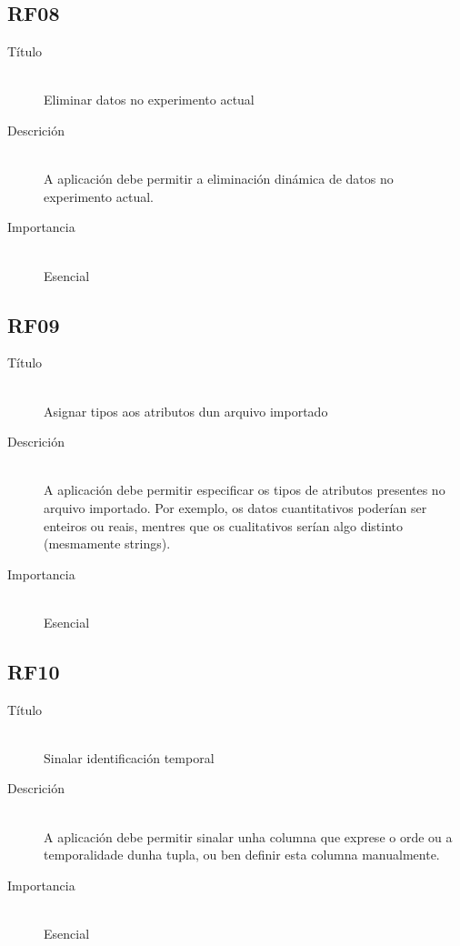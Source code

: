 \subsection*{RF08}
\begin{description}
\item[Título] \hfill \\
Eliminar datos no experimento actual
\item[Descrición] \hfill \\
A aplicación debe permitir a eliminación dinámica de datos no experimento actual.
\item[Importancia] \hfill \\
Esencial
\end{description}

\subsection*{RF09}
\begin{description}
\item[Título] \hfill \\
Asignar tipos aos atributos dun arquivo importado
\item[Descrición] \hfill \\
A aplicación debe permitir especificar os tipos de atributos presentes no arquivo importado. Por exemplo, os datos cuantitativos poderían ser enteiros ou reais, mentres que os cualitativos serían algo distinto (mesmamente strings).
\item[Importancia] \hfill \\
Esencial
\end{description}

\subsection*{RF10}
\begin{description}
\item[Título] \hfill \\
Sinalar identificación temporal
\item[Descrición] \hfill \\
A aplicación debe permitir sinalar unha columna que exprese o orde ou a temporalidade dunha tupla, ou ben definir esta columna manualmente.
\item[Importancia] \hfill \\
Esencial
\end{description}

